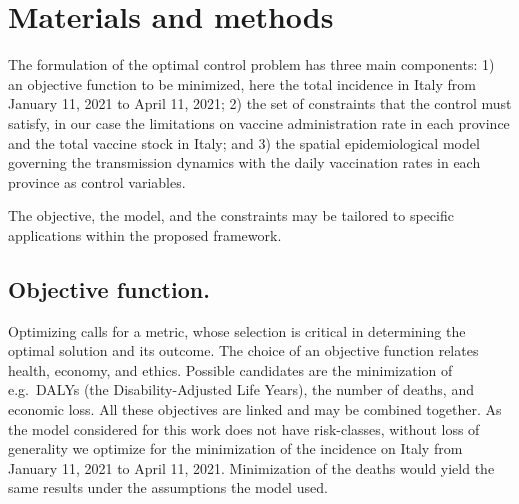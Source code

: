 \section{Materials and methods} \label{sec:matmet}
The formulation of the optimal control problem has three main components: 1) an objective function to be minimized, here the total incidence in Italy from January 11, 2021 to April 11, 2021; 2) the set of constraints that the control must satisfy, in our case the limitations on vaccine administration rate in each province and the total vaccine stock in Italy; and 3) the spatial epidemiological model\cite{Gatto:SpreadDynamicsCOVID19:2020, Bertuzzo:GeographyCOVID19Spread:2020} governing the transmission dynamics with the daily vaccination rates in each province as control variables.

The objective, the model, and the constraints may be tailored to specific applications within the proposed framework.

\subsection{Objective function.} Optimizing calls for a metric, whose selection is critical in determining the optimal solution and its outcome. The choice of an objective function relates health, economy, and ethics. Possible candidates are the minimization of e.g.~DALYs (the Disability-Adjusted Life Years), the number of deaths, and economic loss\cite{Du:ComparativeCosteffectivenessSARSCoV2:2021}. All these objectives are linked and may be combined together. As the model considered for this work does not have risk-classes, without loss of generality we optimize for the minimization of the incidence on Italy from January 11, 2021 to April 11, 2021. Minimization of the deaths would yield the same results under the assumptions the model used.

